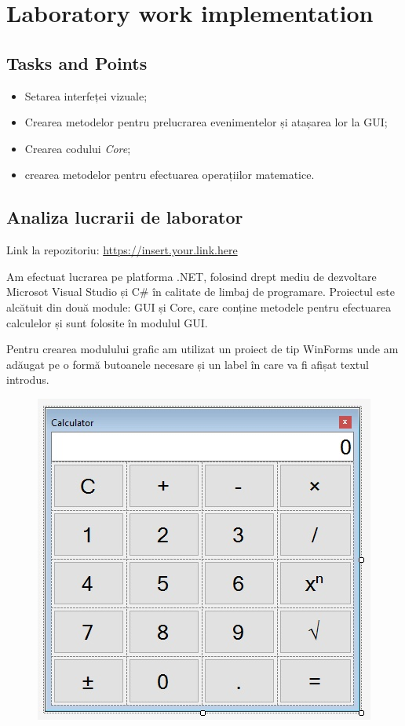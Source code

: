 \section{Laboratory work implementation}

\subsection{Tasks and Points}

\begin{itemize}
 \item Setarea interfeței vizuale;
 \item Crearea metodelor pentru prelucrarea evenimentelor și atașarea lor la GUI;
 \item Crearea codului \textit{Core};
 \item crearea metodelor pentru efectuarea operațiilor matematice.
\end{itemize}

\subsection{Analiza lucrarii de laborator}

\par Link la repozitoriu: \url{https://insert.your.link.here} 

\par Am efectuat lucrarea pe platforma .NET\cite{net}, folosind drept mediu de dezvoltare Microsot Visual Studio\cite{vs} și C\# în calitate de limbaj de programare. Proiectul este alcătuit din două module: GUI și Core, care conține metodele pentru efectuarea calculelor și sunt folosite în modulul GUI.

\par Pentru crearea modulului grafic am utilizat un proiect de tip WinForms unde am adăugat pe o formă butoanele necesare și un label în care va fi afișat textul introdus.

\begin{figure}[ht]
 \includegraphics[scale=1]{imagini/interfata}
 \centering
\end{figure}

